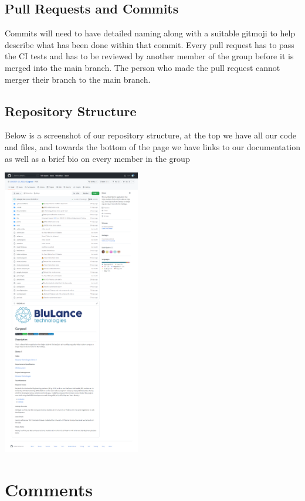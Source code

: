\documentclass[hidelinks, 12pt, a4paper]{article}
\begin{document}
\subsection{Pull Requests and Commits}
Commits will need to have detailed naming along with a suitable gitmoji to help describe what has been done within that commit.
Every pull request has to pass the CI tests and has to be reviewed by another member of the group before it is merged into the main branch.  The person who made the pull request cannot merger their branch to the main branch.
\vspace{0.5cm} 
\newpage
\subsection{Repository Structure}
Below is a screenshot of our repository structure, at the top we have all our code and files, and towards the bottom of the page we have links to our documentation as well as a brief bio on every member in the group
\begin{center}
    \includegraphics[width=6cm]{images/GitHub.png} \\
\end{center}
\vspace{0.5cm} 

\newpage  

\section{Comments}
    
\end{document}
